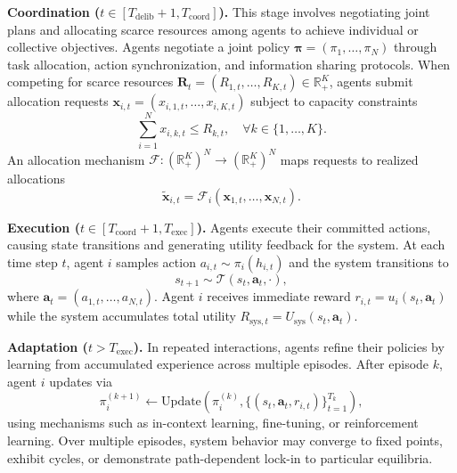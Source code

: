\documentclass[11pt, letterpaper, shortlabels]{berkeley}
\begin{document}
\noindent\textbf{Coordination ($t \in [T_{\text{delib}}+1, T_{\text{coord}}]$).} 
This stage involves negotiating joint plans and allocating scarce resources among agents to achieve individual or collective objectives.
Agents negotiate a joint policy $\boldsymbol{\pi} = (\pi_1, \ldots, \pi_N)$ through task allocation, action synchronization, and information sharing protocols. When competing for scarce resources $\mathbf{R}_t = (R_{1,t}, \ldots, R_{K,t}) \in \mathbb{R}_+^K$, agents submit allocation requests $\mathbf{x}_{i,t} = (x_{i,1,t}, \ldots, x_{i,K,t})$ subject to capacity constraints
\begin{equation}
\sum_{i=1}^N x_{i,k,t} \leq R_{k,t}, \quad \forall k \in \{1, \ldots, K\}.
\end{equation}
An allocation mechanism $\mathcal{F}: (\mathbb{R}_+^K)^N \to (\mathbb{R}_+^K)^N$ maps requests to realized allocations
\begin{equation}
\tilde{\mathbf{x}}_{i,t} = \mathcal{F}_i(\mathbf{x}_{1,t}, \ldots, \mathbf{x}_{N,t}).
\end{equation}

\noindent\textbf{Execution ($t \in [T_{\text{coord}}+1, T_{\text{exec}}]$).} 
Agents execute their committed actions, causing state transitions and generating utility feedback for the system.
At each time step $t$, agent $i$ samples action $a_{i,t} \sim \pi_i(h_{i,t})$ and the system transitions to
\begin{equation}
s_{t+1} \sim \mathcal{T}(s_t, \mathbf{a}_t, \cdot),
\end{equation}
where $\mathbf{a}_t = (a_{1,t}, \ldots, a_{N,t})$. Agent $i$ receives immediate reward $r_{i,t} = u_i(s_t, \mathbf{a}_t)$ while the system accumulates total utility $R_{\text{sys},t} = U_{\text{sys}}(s_t, \mathbf{a}_t)$.

\noindent\textbf{Adaptation ($t > T_{\text{exec}}$).} 
In repeated interactions, agents refine their policies by learning from accumulated experience across multiple episodes.
After episode $k$, agent $i$ updates via
\begin{equation}
\pi_i^{(k+1)} \leftarrow \text{Update}\left(\pi_i^{(k)}, \{(s_t, \mathbf{a}_t, r_{i,t})\}_{t=1}^{T_k}\right),
\end{equation}
using mechanisms such as in-context learning, fine-tuning, or reinforcement learning. Over multiple episodes, system behavior may converge to fixed points, exhibit cycles, or demonstrate path-dependent lock-in to particular equilibria.
\end{document}
